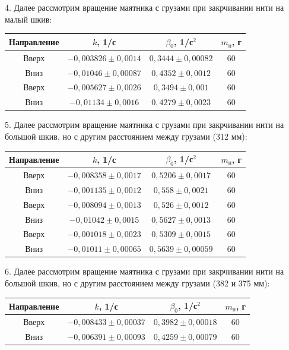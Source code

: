 4. Далее рассмотрим вращение маятника с грузами при закрчивании нити на малый шкив:
\begin{center}
\begin{tabular}{|c|c|c|c|}
    \hline
    Направление & $k$, 1/с & $\beta_0$, 1/с$^2$ & $m_\text{н}$, г \\
    \hline
    Вверх & $-0,003826 \pm 0,0014$ & $0,3444 \pm 0,00082$ & 60 \\
    \hline
    Вниз &$-0,01046 \pm 0,00087$ & $0,4352 \pm 0,0012$ & 60 \\
    \hline
    Вверх &$-0,005627 \pm 0,0026$ & $0,3494 \pm 0,001$ & 60 \\
    \hline
    Вниз &$-0,01134 \pm 0,0016$ & $0,4279 \pm 0,0023$ & 60 \\
    \hline

\end{tabular}
\end{center}

5. Далее рассмотрим вращение маятника с грузами при закрчивании нити на большой шкив, но с другим расстоянием между грузами (312 мм):

\begin{center}
\begin{tabular}{|c|c|c|c|}
    \hline
    Направление & $k$, 1/с & $\beta_0$, 1/с$^2$ & $m_\text{н}$, г \\
    \hline
    Вверх & $-0,008358 \pm 0,0017$ & $0,5206 \pm 0,0017$ & 60 \\
    \hline
    Вниз &$-0,001135 \pm 0,0012$ & $0,558 \pm 0,0021$ & 60 \\
    \hline
    Вверх &$-0,008094 \pm 0,0013$ & $0,526 \pm 0,0012$ & 60 \\
    \hline
    Вниз &$-0,01042 \pm 0,0015$ & $0,5627 \pm 0,0013$ & 60 \\
    \hline
    Вверх &$-0,001018 \pm 0,0023$ & $0,5309 \pm 0,0015$ & 60 \\
    \hline
    Вниз &$-0,01011 \pm 0,00065$ & $0,5639 \pm 0,00059$ & 60 \\
    \hline

\end{tabular}
\end{center}

6. Далее рассмотрим вращение маятника с грузами при закрчивании нити на большой шкив, но с другим расстоянием между грузами (382 и 375 мм):

\begin{center}
\begin{tabular}{|c|c|c|c|}
    \hline
    Направление & $k$, 1/с & $\beta_0$, 1/с$^2$ & $m_\text{н}$, г \\
    \hline
    Вверх & $-0,008433 \pm 0,00037$ & $0,3982 \pm 0,00018$ & 60 \\
    \hline
    Вниз &$-0,006391 \pm 0,00093$ & $0,4259 \pm 0,00079$ & 60 \\
    \hline

\end{tabular}
\end{center}

